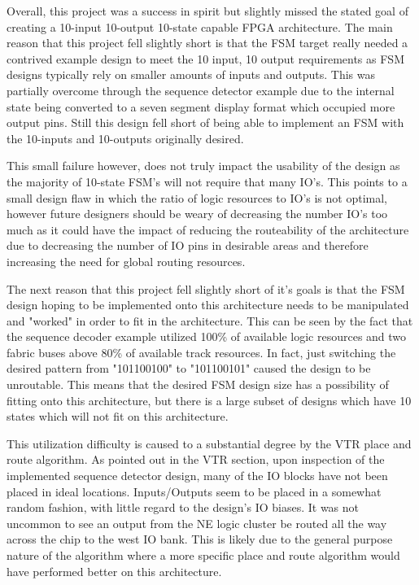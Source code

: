 \documentclass[12pt]{article}
\begin{document}
Overall, this project was a success in spirit but slightly missed the stated goal of
creating a 10-input 10-output 10-state capable FPGA architecture. The main reason that
this project fell slightly short is that the FSM target really needed a contrived
example design to meet the 10 input, 10 output requirements as FSM designs typically
rely on smaller amounts of inputs and outputs. This was partially overcome through the
sequence detector example due to the internal state being converted to a seven segment
display format which occupied more output pins. Still this design fell short of being
able to implement an FSM with the 10-inputs and 10-outputs originally desired.

This small failure however, does not truly impact the usability of the design as the
majority of 10-state FSM's will not require that many IO's. This points to a small design flaw
in which the ratio of logic resources to IO's is not optimal, however future designers
should be weary of decreasing the number IO's too much as it could have the impact of
reducing the routeability of the architecture due to decreasing
the number of IO pins in desirable areas and therefore increasing the need for global
routing resources.

The next reason that this project fell slightly short of it's goals is that the
FSM design hoping to be implemented onto this architecture needs to be manipulated and
"worked" in order to fit in the architecture. This can be seen by the fact that the
sequence decoder example utilized 100\% of available logic resources and two fabric buses
above 80\% of available track resources. In fact, just switching the desired pattern from "101100100" to
"101100101" caused the design to be unroutable. This means that the desired FSM design
size has a possibility of fitting onto this architecture, but there is a large
subset of designs which have 10 states which will not fit on this architecture.

This utilization difficulty is caused to a substantial degree by the VTR place and route
algorithm. As pointed out in the VTR section, upon inspection of the implemented sequence
detector design, many of the IO blocks have not been placed in ideal locations. Inputs/Outputs seem
to be placed in a somewhat random fashion, with little regard to the design's IO biases.
It was not uncommon to see an output from the NE logic cluster be routed all the way across
the chip to the west IO bank. This is likely due to the general purpose nature of the algorithm
where a more specific place and route algorithm would have performed better on this
architecture.
\end{document}
